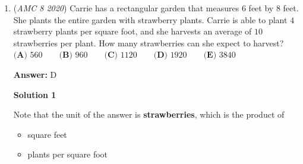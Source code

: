 \begin{enumerate}
 $\textbf{(A) }\$5 \qquad \textbf{(B) }\$10 \qquad \textbf{(C) }\$15 \qquad \textbf{(D) }\$20 \qquad \textbf{(E) }\$25$

 \textbf{Answer: }C



\textbf{Solution}

The friends earn $\$\left(15+20+25+40\right)=\$100$ in total. Since they decided to split their earnings equally, it follows that each person will get $\$\left(\frac{100}{4}\right)=\$25$. Since the friend who earned $\$40$ will need to leave with $\$25$, he will have to give $\$\left(40-25\right)=\boxed{\textbf{(C) }\$15}$ to the others.

 



\textbf{Solution 2}

The friends earn $\$\left(15+20+25+40\right)=\$100$ in total. Since they decided to split their earnings equally, it follows that each person will get $\$\left(\frac{100}{4}\right)=\$25$. The friend who earned $25$ will not distribute anything, the friend that earned $15$ needs $10$, and the friend that earned $20$ needs $5$. $10 + 5 = 15$, therefore the answer is $\$\left(40-25\right)=\boxed{\textbf{(C) }\$15}$.

 


 


	\item (\textit{AMC 8 2020}) Carrie has a rectangular garden that measures $6$ feet by $8$ feet. She plants the entire garden with strawberry plants. Carrie is able to plant $4$ strawberry plants per square foot, and she harvests an average of $10$ strawberries per plant. How many strawberries can she expect to harvest?
$\textbf{(A) }560 \qquad \textbf{(B) }960 \qquad \textbf{(C) }1120 \qquad \textbf{(D) }1920 \qquad \textbf{(E) }3840$

 \textbf{Answer: }D



\textbf{Solution 1}

Note that the unit of the answer is \textbf{strawberries}, which is the product of

 
            \begin{itemize}
        \item square feet
            \end{itemize}
            
            \begin{itemize}
        \item plants per square foot
            \end{itemize}
            

\end{enumerate}
